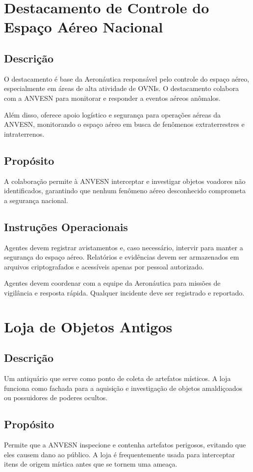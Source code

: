 \documentclass{book}
\begin{document}
\chapter{Destacamento de Controle do Espaço Aéreo Nacional}

\section{Descrição}
O destacamento é base da Aeronáutica responsável pelo controle do espaço aéreo, especialmente em áreas de alta atividade de OVNIs. O destacamento colabora com a ANVESN para monitorar e responder a eventos aéreos anômalos.

Além disso, oferece apoio logístico e segurança para operações aéreas da ANVESN, monitorando o espaço aéreo em busca de fenômenos extraterrestres e intraterrenos.

\section{Propósito}
A colaboração permite à ANVESN interceptar e investigar objetos voadores não identificados, garantindo que nenhum fenômeno aéreo desconhecido comprometa a segurança nacional.

\section{Instruções Operacionais}
Agentes devem registrar avistamentos e, caso necessário, intervir para manter a segurança do espaço aéreo. Relatórios e evidências devem ser armazenados em arquivos criptografados e acessíveis apenas por pessoal autorizado.

Agentes devem coordenar com a equipe da Aeronáutica para missões de vigilância e resposta rápida. Qualquer incidente deve ser registrado e reportado.

\chapter{Loja de Objetos Antigos}
\section{Descrição}
Um antiquário que serve como ponto de coleta de artefatos místicos. A loja funciona como fachada para a aquisição e investigação de objetos amaldiçoados ou possuidores de poderes ocultos.

\section{Propósito}
Permite que a ANVESN inspecione e contenha artefatos perigosos, evitando que eles causem dano ao público. A loja é frequentemente usada para interceptar itens de origem mística antes que se tornem uma ameaça.
\end{document}
